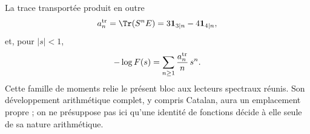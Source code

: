 La trace transportée produit en outre
\[
a_n^{\rm tr}=\Tr(S^nE)=3\mathbf1_{3\mid n}-4\mathbf1_{4\mid n},
\]
et, pour $|s|<1$,
\[
-\log F(s)=\sum_{n\ge1}\frac{a_n^{\rm tr}}n\,s^n.
\]
Cette famille de moments relie le présent bloc aux lecteurs
spectraux réunis. Son développement arithmétique complet, y compris
Catalan, aura un emplacement propre ; on ne présuppose pas ici qu'une
identité de fonctions décide à elle seule de sa nature arithmétique.

